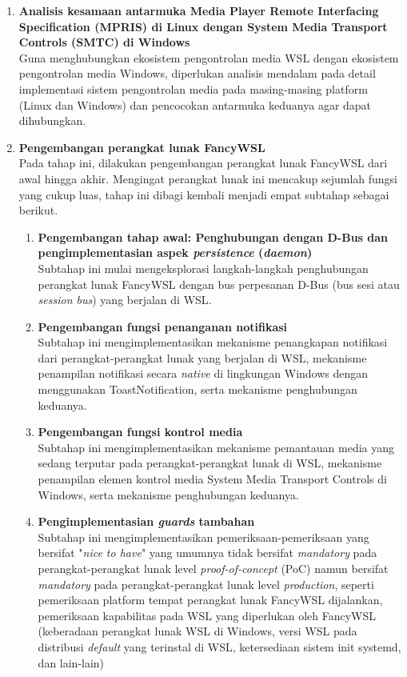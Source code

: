 \begin{enumerate}
    \item \textbf{Analisis kesamaan antarmuka Media Player Remote Interfacing Specification (MPRIS) di Linux dengan System Media Transport Controls (SMTC) di Windows}\\
    Guna menghubungkan ekosistem pengontrolan media WSL dengan ekosistem pengontrolan media Windows, diperlukan analisis mendalam pada detail implementasi sistem pengontrolan media pada masing-masing platform (Linux dan Windows) dan pencocokan antarmuka keduanya agar dapat dihubungkan.

    \item \textbf{Pengembangan perangkat lunak FancyWSL}\\
    Pada tahap ini, dilakukan pengembangan perangkat lunak FancyWSL dari awal hingga akhir. Mengingat perangkat lunak ini mencakup sejumlah fungsi yang cukup luas, tahap ini dibagi kembali menjadi empat subtahap sebagai berikut.
    \begin{enumerate}
        \item \textbf{Pengembangan tahap awal: Penghubungan dengan D-Bus dan pengimplementasian aspek \textit{persistence} (\textit{daemon})}\\
        Subtahap ini mulai mengeksplorasi langkah-langkah penghubungan perangkat lunak FancyWSL dengan bus perpesanan D-Bus (bus sesi atau \textit{session bus}) yang berjalan di WSL.
        
        \item \textbf{Pengembangan fungsi penanganan notifikasi}\\
        Subtahap ini mengimplementasikan mekanisme penangkapan notifikasi dari perangkat-perangkat lunak yang berjalan di WSL, mekanisme penampilan notifikasi secara \textit{native} di lingkungan Windows dengan menggunakan ToastNotification, serta mekanisme penghubungan keduanya.

        \item \textbf{Pengembangan fungsi kontrol media}\\
        Subtahap ini mengimplementasikan mekanisme pemantauan media yang sedang terputar pada perangkat-perangkat lunak di WSL, mekanisme penampilan elemen kontrol media System Media Transport Controls di Windows, serta mekanisme penghubungan keduanya.

        \item \textbf{Pengimplementasian \textit{guards} tambahan}\\
        Subtahap ini mengimplementasikan pemeriksaan-pemeriksaan yang bersifat "\textit{nice to have}" yang umumnya tidak bersifat \textit{mandatory} pada perangkat-perangkat lunak level \textit{proof-of-concept} (PoC) namun bersifat \textit{mandatory} pada perangkat-perangkat lunak level \textit{production}, seperti pemeriksaan platform tempat perangkat lunak FancyWSL dijalankan, pemeriksaan kapabilitas pada WSL yang diperlukan oleh FancyWSL (keberadaan perangkat lunak WSL di Windows, versi WSL pada distribusi \textit{default} yang terinstal di WSL, ketersediaan sistem init systemd, dan lain-lain)
    \end{enumerate}


\end{enumerate}
